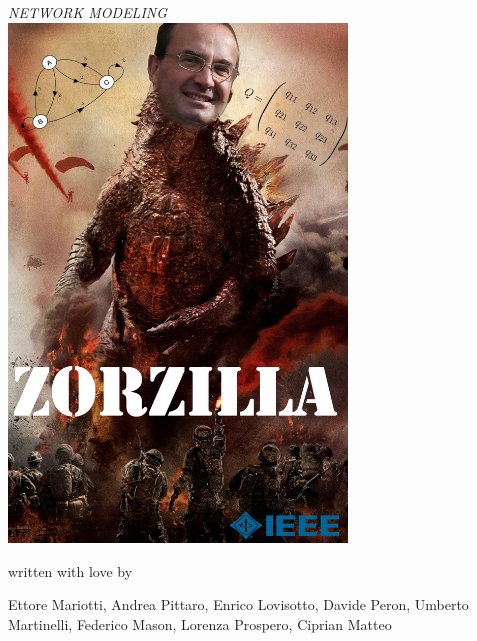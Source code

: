\documentclass[a4paper, 12pt, twoside, openright,fleqn]{book}
\theoremstyle{theoremdd}
\theoremstyle{remark}
\begin{document}
\frontmatter

\begin{titlepage} %
\begin{center}


\hspace{0.5cm}

\emph{\Large{NETWORK MODELING}} \\
\vspace{1cm}
\includegraphics[width=9cm]{Zorzilla}\\
\vspace{0.5cm}
{written with love by\par}
{\Large Ettore Mariotti, Andrea Pittaro, Enrico Lovisotto, Davide Peron, Umberto Martinelli, Federico Mason, Lorenza Prospero, Ciprian Matteo\par}
\end{center}



\end{titlepage}
\end{document}
